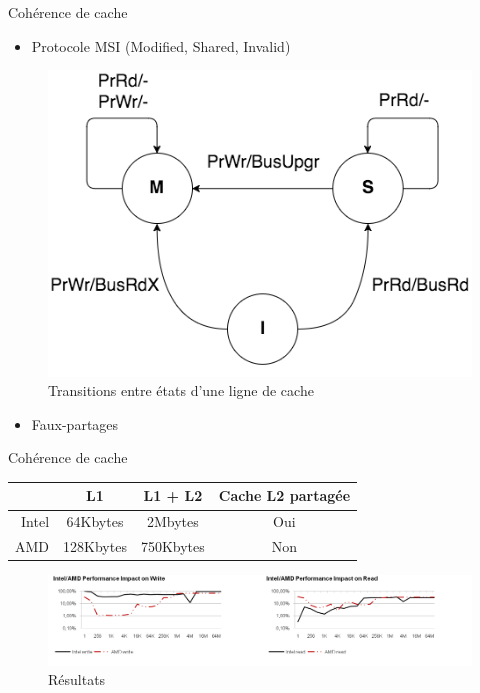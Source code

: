 \documentclass{beamer}
\begin{document}
\begin{frame}{Cohérence de cache}
	\begin{itemize}
		\item Protocole MSI (Modified, Shared, Invalid)
	\end{itemize}
	\begin{figure}
		\centering
		\includegraphics[width=0.6\linewidth]{State_diagram_for_processor_transactions.png}
		\caption{Transitions entre états d'une ligne de cache \cite{wiki:MSI_protocol}}
		\label{fig:State_di}
	\end{figure}
	\begin{itemize}
		\item[\faWarning] Faux-partages
	\end{itemize}
\end{frame}

\begin{frame}{Cohérence de cache}

	\begin{center}
		\begin{tabular}{r|ccc}
		& L1 & L1 + L2 & Cache L2 partagée \\
		\hline
			Intel & 64Kbytes & 2Mbytes & Oui \\
			AMD & 128Kbytes & 750Kbytes & Non \\
		\end{tabular}
	\end{center}

	\begin{figure}
		\centering
		\includegraphics[width=0.9\paperwidth]{results_performance_coherency.png}
		\caption{Résultats \cite{Fuch}}
		\label{fig:results_cache_sharing}
	\end{figure}	
\end{frame}
\end{document}
